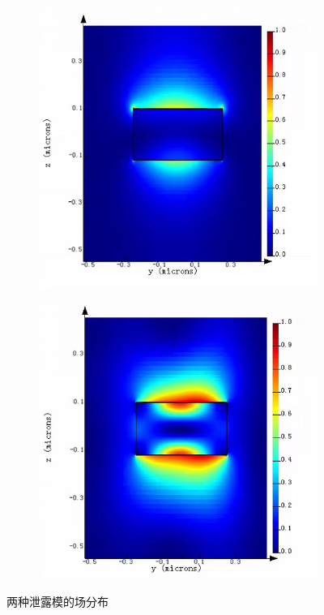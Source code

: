 \documentclass[UTF8,a4paper,12pt]{ctexart}
\numberwithin{equation}{section}
\begin{document}
\begin{figure}[htbp]
\centering
\vspace{-0.5cm} 
\begin{subfigure}[b]{0.45\textwidth}
\centering
\includegraphics[width=\textwidth]{fig14.png}
\subcaption{}
\end{subfigure}%
\hfill
\begin{subfigure}[b]{0.45\textwidth}
\centering
\includegraphics[width=\textwidth]{fig15.png}
\subcaption{}
\end{subfigure}%
\caption{两种泄露模的场分布}
\label{3-4}
\end{figure}
\end{document}
